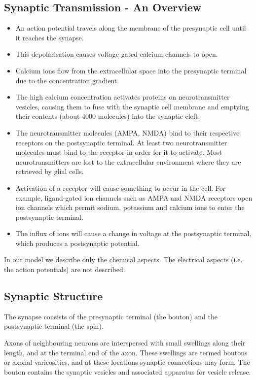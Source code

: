 \documentclass[a4paper]{article}
\begin{document}
\subsection{Synaptic Transmission - An Overview}
\begin{itemize}
    \item An action potential travels along the membrane of the presynaptic cell until it reaches the synapse.
    \item This depolarisation causes voltage gated calcium channels to open.
    \item Calcium ions flow from the extracellular space into the presynaptic terminal due to the concentration gradient.
    \item The high calcium concentration activates proteins on neurotransmitter vesicles, causing them to fuse with the synaptic cell membrane and emptying their contents (about 4000 molecules) into the synaptic cleft.
    \item The neurotransmitter molecules (AMPA, NMDA) bind to their respective receptors on the postsynaptic terminal. At least two neurotransmitter molecules  must bind to the receptor in order for it to activate. Most neurotransmitters are lost to the extracellular environment where they are retrieved by glial cells.
    \item Activation of a receptor will cause something to occur in the cell. For example, ligand-gated ion channels such as AMPA and NMDA receptors open ion channels which permit sodium, potassium and calcium ions to enter the postsynaptic terminal.
    \item The influx of ions will cause a change in voltage at the postsynaptic terminal, which produces a postsynaptic potential.

\end{itemize}

In our model we describe only the chemical aspects. The electrical aspects (i.e. the action potentials) are not described.

\subsection{Synaptic Structure}
The synapse consists of the presynaptic terminal (the bouton) and the postsynaptic terminal (the spin). 

Axons of neighbouring neurons are interspersed with small swellings along their length, and at the terminal end of the axon. These swellings are termed boutons or axonal varicosities, and at these locations synaptic connections may form. The bouton contains the synaptic vesicles and associated apparatus for vesicle release.
\end{document}
